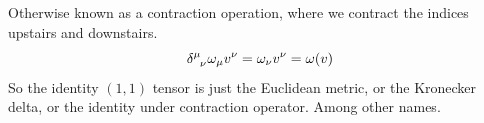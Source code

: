 \begin{solution_pset}
		Otherwise known as a contraction operation, where
		we contract the indices upstairs and downstairs.
		\[
			\delta\indices{^\mu_\nu} \omega_\mu v^\nu = \omega_\nu v^\nu = \omega(v)
		\]
		So the identity $(1,1)$ tensor is just the Euclidean metric, or 
		the Kronecker delta, or the identity under contraction operator.
		Among other names.
	\end{solution_pset}
